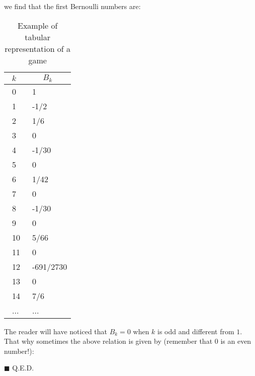 \begin{dem}
		we find that the first Bernoulli numbers are:
		\begin{table}[H]
			\begin{center}
			\begin{tabular}{|p{1cm}|p{2.5cm}|}
					\hline
					\multicolumn{1}{c}{\cellcolor{black!30}\textbf{$k$}} & 
  \multicolumn{1}{c}{\cellcolor{black!30}\textbf{$B_k$}} \\ \hline
					\centering\arraybackslash\ 0 & \centering\arraybackslash\ 1 \\ \hline
					\centering\arraybackslash\ 1 & \centering\arraybackslash\ -1/2 \\ \hline
					\centering\arraybackslash\ 2 & \centering\arraybackslash\ 1/6  \\ \hline
					\centering\arraybackslash\ 3 & \centering\arraybackslash\ 0  \\ \hline
					\centering\arraybackslash\ 4 & \centering\arraybackslash\ -1/30  \\ \hline
					\centering\arraybackslash\ 5 & \centering\arraybackslash\ 0  \\ \hline
					\centering\arraybackslash\ 6 & \centering\arraybackslash\ 1/42  \\ \hline
					\centering\arraybackslash\ 7 & \centering\arraybackslash\ 0  \\ \hline
					\centering\arraybackslash\ 8 & \centering\arraybackslash\ -1/30  \\ \hline
					\centering\arraybackslash\ 9 & \centering\arraybackslash\ 0  \\ \hline
					\centering\arraybackslash\ 10 & \centering\arraybackslash\ 5/66  \\ \hline
					\centering\arraybackslash\ 11 & \centering\arraybackslash\ 0  \\ \hline
					\centering\arraybackslash\ 12 & \centering\arraybackslash\ -691/2730  \\ \hline
					\centering\arraybackslash\ 13 & \centering\arraybackslash\ 0  \\ \hline
					\centering\arraybackslash\ 14 & \centering\arraybackslash\ 7/6  \\ \hline
					\centering\arraybackslash\ ... & \centering\arraybackslash\ $...$  \\ \hline
			\end{tabular}
			\end{center}
			\caption{Example of tabular representation of a game}
		\end{table}	
		The reader will have noticed that $B_k=0$ when $k$ is odd and different from $1$. That why sometimes the above relation is given by (remember that $0$ is an even number!):
		
		\begin{flushright}
			$\blacksquare$  Q.E.D.
		\end{flushright}
	\end{dem}
